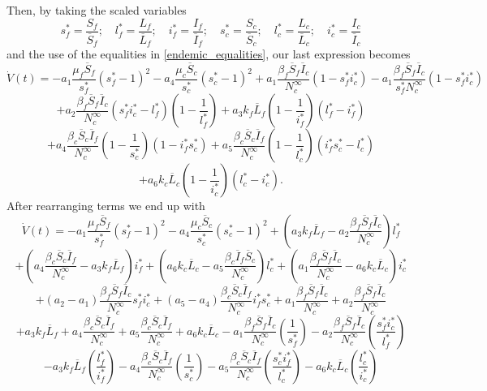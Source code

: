 \documentclass[preprint,12pt]{elsarticle}
\begin{document}
\noindent Then, by taking the scaled variables
$$
s_f^*=\frac{S_f}{\overline{S}_f};\quad l_f^*=\frac{L_f}{\overline{L}_f};\quad i_f^*=\frac{I_f}{\overline{I}_f};\quad
s_c^*=\frac{S_c}{\overline{S}_c};\quad l_c^*=\frac{L_c}{\overline{L}_c};\quad i_c^*=\frac{I_c}{\overline{I}_c}
$$
and the use of the equalities in \ref{endemic_equalities}, our last expression becomes
$$\dot{V}(t)=-a_1\frac{\mu_f\overline{S}_f}{s_f^*}\left(s_f^*-1\right)^2-a_4\frac{\mu_c\overline{S}_c}{s_c^*}\left(s_c^*-1\right)^2+a_1\frac{\beta_f\overline{S}_f\overline{I}_c}{N_c^{\infty}}(1-s_f^*i_c^*)-a_1\frac{\beta_f\overline{S}_f\overline{I}_c}{s_f^*N_c^{\infty}}(1-s_f^*i_c^*)$$
$$+a_2\frac{\beta_f\overline{S}_f\overline{I}_c}{N_c^{\infty}}\left(s_f^*i_c^*-l_f^*\right)\left(1-\frac{1}{l_f^*}\right)+a_3k_f\overline{L}_f\left(1-\frac{1}{i_f^*}\right)\left(l_f^*-i_f^*\right)$$
$$+a_4\frac{\beta_c\overline{S}_c\overline{I}_f}{N_c^{\infty}}\left(1-\frac{1}{s_c^*}\right)\left(1-i_f^*s_c^*\right)+a_5\frac{\beta_c\overline{S}_c\overline{I}_f}{N_c^{\infty}}\left(1-\frac{1}{l_c^*}\right)\left(i_f^*s_c^*-l_c^*\right)$$
$$+a_6k_c\overline{L}_c\left(1-\frac{1}{i_c^*}\right)\left(l_c^*-i_c^*\right).$$
After rearranging terms we end up with
$$\dot{V}(t)=-a_1\frac{\mu_f\overline{S}_f}{s_f^*}\left(s_f^*-1\right)^2-a_4\frac{\mu_c\overline{S}_c}{s_c^*}\left(s_c^*-1\right)^2+\left(a_3k_f\overline{L}_f-a_2\frac{\beta_f\overline{S}_f\overline{I}_c}{N_c^{\infty}}\right)l_f^*$$
$$+\left(a_4\frac{\beta_c\overline{S}_c\overline{I}_f}{N_c^{\infty}}-a_3k_f\overline{L}_f\right)i_f^*+\left(a_6k_c\overline{L}_c-a_5\frac{\beta_c\overline{I}_f\overline{S}_c}{N_c^{\infty}}\right)l_c^*+\left(a_1\frac{\beta_f\overline{S}_f\overline{I}_c}{N_c^{\infty}}-a_6k_c\overline{L}_c\right)i_c^*$$
$$+\left(a_2-a_1\right)\frac{\beta_f\overline{S}_f\overline{I}_c}{N_c^{\infty}}s_f^*i_c^*+\left(a_5-a_4\right)\frac{\beta_c\overline{S}_c\overline{I}_f}{N_c^{\infty}}i_f^*s_c^*+a_1\frac{\beta_f\overline{S}_f\overline{I}_c}{N_c^{\infty}}+a_2\frac{\beta_f\overline{S}_f\overline{I}_c}{N_c^{\infty}}$$
$$+a_3k_f\overline{L}_f+a_4\frac{\beta_c\overline{S}_c\overline{I}_f}{N_c^{\infty}}+a_5\frac{\beta_c\overline{S}_c\overline{I}_f}{N_c^{\infty}}+a_6k_c\overline{L}_c-a_1\frac{\beta_f\overline{S}_f\overline{I}_c}{N_c^{\infty}}\left(\frac{1}{s_f^*}\right)-a_2\frac{\beta_f\overline{S}_f\overline{I}_c}{N_c^{\infty}}\left(\frac{s_f^*i_c^*}{l_f^*}\right)$$
$$-a_3k_f\overline{L}_f\left(\frac{l_f^*}{i_f^*}\right)-a_4\frac{\beta_c\overline{S}_c\overline{I}_f}{N_c^{\infty}}\left(\frac{1}{s_c^*}\right)-a_5\frac{\beta_c\overline{S}_c\overline{I}_f}{N_c^{\infty}}\left(\frac{s_c^*i_f^*}{l_c^*}\right)-a_6k_c\overline{L}_c\left(\frac{l_c^*}{i_c^*}\right) $$
\end{document}
